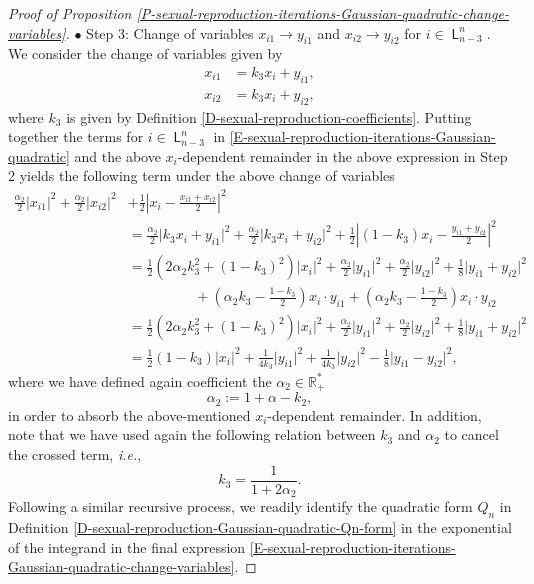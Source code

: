 \documentclass[reqno]{amsart}
\DeclareMathOperator{\Level}{\mathsf{L}}
\numberwithin{equation}{section}
\begin{document}
{\begin{proof}[Proof of Proposition \ref{P-sexual-reproduction-iterations-Gaussian-quadratic-change-variables}]
$\bullet$ {\sc Step 3}: Change of variables $x_{i1}\rightarrow y_{i1}$ and $x_{i2}\rightarrow y_{i2}$ for $i\in \Level_{n-3}^n$.\\
We consider the change of variables given by
\begin{align*}
x_{i1}&=k_3x_i+y_{i1},\\
x_{i2}&=k_3x_i+y_{i2},
\end{align*}
where $k_3$ is given by Definition \ref{D-sexual-reproduction-coefficients}. Putting together the terms for $i\in \Level_{n-3}^n$ in \eqref{E-sexual-reproduction-iterations-Gaussian-quadratic} and the above $x_i$-dependent remainder in the above expression in {\sc Step 2} yields the following term under the above change of variables
\begin{align*}
\frac{\alpha_2}{2}\vert x_{i1}\vert^2+\frac{\alpha_2}{2}\vert x_{i2}\vert^2&+\frac{1}{2}\left\vert x_i-\frac{x_{i1}+x_{i2}}{2}\right\vert^2\\
&=\frac{\alpha_2}{2}\vert k_3x_i+y_{i1}\vert^2+\frac{\alpha_2}{2}\vert k_3 x_i+y_{i2}\vert^2+\frac{1}{2}\left\vert (1-k_3)x_i-\frac{y_{i1}+y_{i2}}{2}\right\vert^2\\
&=\frac{1}{2}\left(2\alpha_2 k_3^2+(1-k_3)^2\right)\vert x_i\vert^2+\frac{\alpha_2}{2}\vert y_{i1}\vert^2+\frac{\alpha_2}{2}\vert y_{i2}\vert^2+\frac{1}{8}\vert y_{i1}+y_{i2}\vert^2\\
&\hspace{2cm} +\left(\alpha_2 k_3-\frac{1-k_3}{2}\right)x_i\cdot y_{i1}+\left(\alpha_2 k_3-\frac{1-k_3}{2}\right)x_i\cdot y_{i2}\\
&=\frac{1}{2}\left(2\alpha_2 k_3^2+(1-k_3)^2\right)\vert x_i\vert^2+\frac{\alpha_2}{2}\vert y_{i1}\vert^2+\frac{\alpha_2}{2}\vert y_{i2}\vert^2+\frac{1}{8}\vert y_{i1}+y_{i2}\vert^2\\
&=\frac{1}{2}(1-k_3)\vert x_i\vert^2+\frac{1}{4 k_3}\vert y_{i1}\vert^2+\frac{1}{4 k_3}\vert y_{i2}\vert^2-\frac{1}{8}\vert y_{i1}-y_{i2}\vert^2,
\end{align*}
where we have defined again coefficient the $\alpha_2\in \mathbb{R}_+^*$
$$\alpha_2:=1+\alpha-k_2,$$
in order to absorb the above-mentioned $x_i$-dependent remainder. In addition, note that we have used again the following relation between $k_3$ and $\alpha_2$ to cancel the crossed term, {\em i.e.},
$$k_3=\frac{1}{1+2\alpha_2}.$$
Following a similar recursive process, we readily identify the quadratic form $Q_n$ in Definition \ref{D-sexual-reproduction-Gaussian-quadratic-Qn-form} in the exponential of the integrand in the final expression \eqref{E-sexual-reproduction-iterations-Gaussian-quadratic-change-variables}.


\end{proof}}
\end{document}
